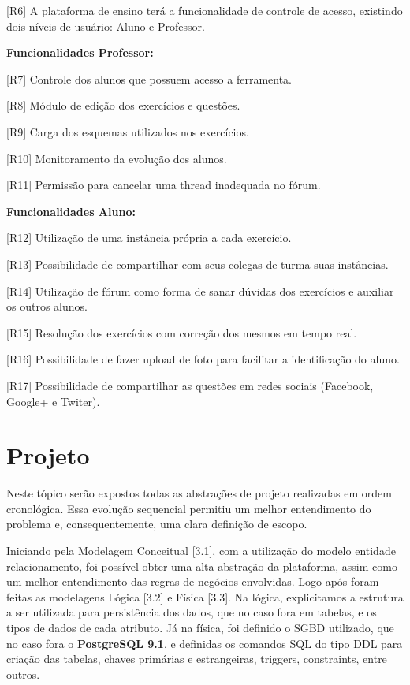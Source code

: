 \documentclass[graduacao,brazil]{ThesisPUC}
\begin{document}
[R6] A plataforma de ensino ter\'{a} a funcionalidade de controle de acesso, existindo dois n\'{i}veis de usu\'{a}rio:
Aluno e Professor.

\textbf{Funcionalidades Professor:}

[R7] Controle dos alunos que possuem acesso a ferramenta.

[R8] M\'{o}dulo de edi\c{c}\~{a}o dos exerc\'{i}cios e quest\~{o}es.

[R9] Carga dos esquemas utilizados nos exerc\'{i}cios.

[R10] Monitoramento da evolu\c{c}\~{a}o dos alunos.

[R11] Permiss\~{a}o para cancelar uma thread inadequada no f\'{o}rum.

\textbf{Funcionalidades Aluno:}

[R12] Utiliza\c{c}\~{a}o de uma inst\^{a}ncia pr\'{o}pria a cada exerc\'{i}cio.

[R13] Possibilidade de compartilhar com seus colegas de turma suas inst\^{a}ncias.

[R14] Utiliza\c{c}\~{a}o de f\'{o}rum como forma de sanar d\'{u}vidas dos exerc\'{i}cios e auxiliar os outros alunos.

[R15] Resolu\c{c}\~{a}o dos exerc\'{i}cios com corre\c{c}\~{a}o dos mesmos em tempo real.

[R16] Possibilidade de fazer upload de foto para facilitar a identifica\c{c}\~{a}o do aluno.

[R17] Possibilidade de compartilhar as quest\~{o}es em redes sociais (Facebook, Google+ e Twiter).


\chapter{Projeto}

Neste t\'{o}pico ser\~{a}o expostos todas as abstra\c{c}\~{o}es de projeto realizadas em ordem
cronol\'{o}gica. Essa evolu\c{c}\~{a}o sequencial permitiu um melhor entendimento do problema e,
consequentemente, uma clara defini\c{c}\~{a}o de escopo.

Iniciando pela Modelagem Conceitual [3.1], com a utiliza\c{c}\~{a}o do modelo entidade
relacionamento, foi poss\'{i}vel obter uma alta abstra\c{c}\~{a}o da plataforma, assim como um melhor
entendimento das regras de neg\'{o}cios envolvidas. Logo ap\'{o}s foram feitas as modelagens L\'{o}gica
[3.2] e F\'{i}sica [3.3]. Na l\'{o}gica, explicitamos a estrutura a ser utilizada para persist\^{e}ncia dos dados,
que no caso fora em tabelas, e os tipos de dados de cada atributo. J\'{a} na f\'{i}sica, foi definido o
SGBD utilizado, que no caso fora o \textbf{PostgreSQL 9.1}, e definidas os comandos SQL do tipo DDL
para criação das tabelas, chaves primárias e estrangeiras, triggers, constraints, entre outros.
\end{document}
